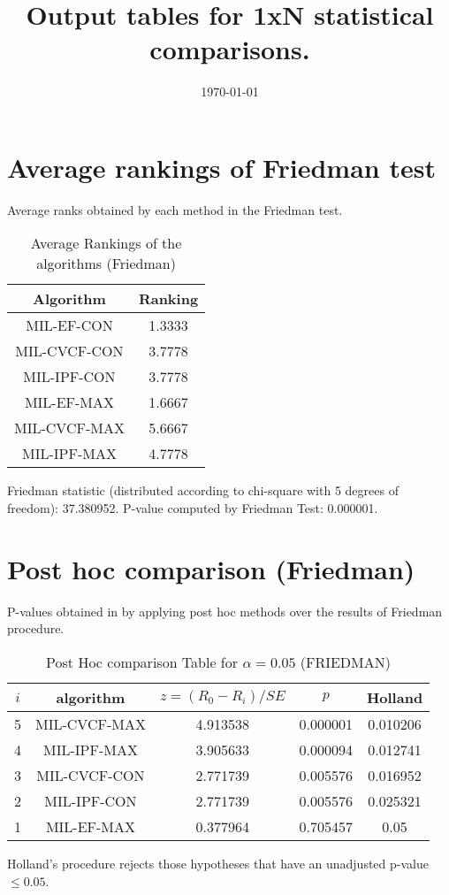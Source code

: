 \documentclass[a4paper,10pt]{article}
\title{Output tables for 1xN statistical comparisons.}
\author{}
\date{\today}
\begin{document}
\begin{landscape}
\pagestyle{empty}
\maketitle
\thispagestyle{empty}

\section{Average rankings of Friedman test}


Average ranks obtained by each method in the Friedman test.

\begin{table}[!htp]
\centering
\begin{tabular}{|c|c|}\hline
Algorithm&Ranking\\\hline
MIL-EF-CON&1.3333\\MIL-CVCF-CON&3.7778\\MIL-IPF-CON&3.7778\\MIL-EF-MAX&1.6667\\MIL-CVCF-MAX&5.6667\\MIL-IPF-MAX&4.7778\\\hline\end{tabular}
\caption{Average Rankings of the algorithms (Friedman)}
\end{table}

Friedman statistic (distributed according to chi-square with 5 degrees of freedom): 37.380952. \newline P-value computed by Friedman Test: 0.000001.\newline


\newpage

\section{Post hoc comparison (Friedman)}


P-values obtained in by applying post hoc methods over the results of Friedman procedure.

\begin{table}[!htp]
\centering\footnotesize
\begin{tabular}{ccccc}
$i$&algorithm&$z=(R_0 - R_i)/SE$&$p$&Holland\\
\hline5&MIL-CVCF-MAX&4.913538&0.000001&0.010206\\4&MIL-IPF-MAX&3.905633&0.000094&0.012741\\3&MIL-CVCF-CON&2.771739&0.005576&0.016952\\2&MIL-IPF-CON&2.771739&0.005576&0.025321\\1&MIL-EF-MAX&0.377964&0.705457&0.05\\\hline
\end{tabular}
\caption{Post Hoc comparison Table for $\alpha=0.05$ (FRIEDMAN)}
\end{table}Holland's procedure rejects those hypotheses that have an unadjusted p-value $\le0.05$.



\end{landscape}
\end{document}
